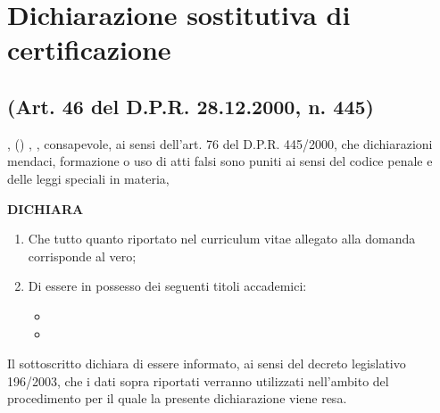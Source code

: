 \section*{Dichiarazione sostitutiva di certificazione}
\subsection*{(Art. 46 del D.P.R. 28.12.2000, n. 445)}

\noindent \myTextField[.5cm]{}   ,  () , , consapevole, ai sensi dell’art. 76 del D.P.R. 445/2000, che
dichiarazioni mendaci, formazione o uso di atti falsi sono puniti ai sensi del codice penale e delle leggi speciali in materia,
\begin{center}
 \textbf{DICHIARA}
\end{center}
\begin{enumerate}
 \item Che tutto quanto riportato nel curriculum vitae allegato alla domanda corrisponde al vero;
 \item Di essere in possesso dei seguenti titoli accademici:
 \begin{itemize}
  \item \myTextField[.8\textwidth]{}
  \item \myTextField[.8\textwidth]{}
 \end{itemize}
\end{enumerate}
Il sottoscritto dichiara di essere informato, ai sensi del decreto legislativo 196/2003, che i dati sopra riportati verranno utilizzati nell'ambito del procedimento per il quale la presente dichiarazione viene resa.